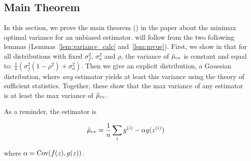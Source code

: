 \subsection{Main Theorem}

In this section, we prove the main theorem () in the paper about the minimax optimal variance for an unbiased estimator.  will follow from the two following lemmas (Lemmas~\ref{lem:variance_calc} and~\ref{lem:mvue}). First, we show in  that for all distributions with fixed $\sigma^2_f$, $\sigma^2_a$ and $\rho$, the variance of $\hat \mu_\text{cv}$ is constant and equal to: $\frac{1}{n}(\sigma_f^2(1-\rho^2)+\sigma_a^2)$.
Then we give an explicit distribution, a Gaussian distribution, where \emph{any} estimator yields at least this variance using the theory of sufficient statistics.
Together, these show that the max variance of any estimator is at least the max variance of $\hat \mu_\text{cv}$.

As a reminder, the estimator is 

\begin{align}
\hat \mu_\text{cv} = \frac{1}{n} \sum_i y^{(i)} - \alpha g(z^{(i)})
\end{align}

where $\alpha = \operatorname{Cov}(f(z),g(z))$.



